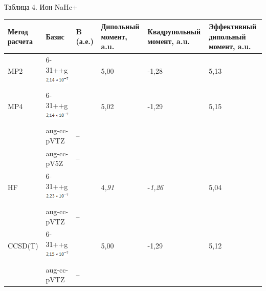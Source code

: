 \documentclass{article}
\begin{document}
\vspace{10pt}
\begin{center}
Таблица 4. Ион NaHe+\pagebreak{}
\end{center}

\vspace{23pt}
\baselineskip=13pt
\leftskip=0pt
\begin{tabular}{|>{\raggedright}p{33pt}|>{\raggedright}p{44pt}|>{\raggedright}p{41pt}|>{\raggedright}p{40pt}|>{\raggedright}p{53pt}|>{\raggedright}p{60pt}|}
\hline
М\textbf{етод расчета} & Б\textbf{азис} & B\textbf{ (а.е.)} & Д\textbf{ипольный 
момент, a.u.} & К\textbf{вадрупольный момент, a.u.} & Э\textbf{ффективный 
дипольный момент, a.u.}\tabularnewline
\hline
MP2 & 6-31++g
\includegraphics[width=54pt, height=15pt, keepaspectratio=true]{7-fig009.png}
 &  & 5,00 & -1,28 & 5,13\tabularnewline
\hline
MP4 & 6-31++g
\includegraphics[width=54pt, height=15pt, keepaspectratio=true]{7-fig010.png}
 &  & 5,02 & -1,29 & 5,15\tabularnewline
\hline
 & aug-cc-pVTZ & -- &  &  & \tabularnewline
\hline
 & aug-cc-pV5Z & -- &  &  & \tabularnewline
\hline
HF & 6-31++g
\includegraphics[width=54pt, height=15pt, keepaspectratio=true]{7-fig011.png}
 &  & 4\textit{,91} & -\textit{1,26} & 5,04\tabularnewline
\hline
 & aug-cc-pVTZ & -- &  &  & \tabularnewline
\hline
CCSD(T) & 6-31++g
\includegraphics[width=54pt, height=15pt, keepaspectratio=true]{7-fig012.png}
 &  & 5,00 & -1,29 & 5,12\tabularnewline
\hline
 & aug-cc-pVTZ & -- &  &  & \tabularnewline
\hline
\end{tabular}
\end{document}
